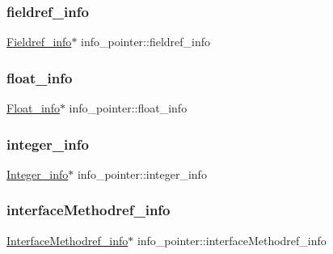 \subsubsection{\texorpdfstring{fieldref\+\_\+info}{fieldref\_info}}
{\footnotesize\ttfamily \hyperlink{struct_fieldref__info}{Fieldref\+\_\+info}$\ast$ info\+\_\+pointer\+::fieldref\+\_\+info}

\hypertarget{unioninfo__pointer_ab4a8a16c10bfcfa7ac7260d4e51d8efc}{}\label{unioninfo__pointer_ab4a8a16c10bfcfa7ac7260d4e51d8efc} 
\subsubsection{\texorpdfstring{float\+\_\+info}{float\_info}}
{\footnotesize\ttfamily \hyperlink{struct_float__info}{Float\+\_\+info}$\ast$ info\+\_\+pointer\+::float\+\_\+info}

\hypertarget{unioninfo__pointer_a05c14a16d3495a2eeb21282cc9ea14fd}{}\label{unioninfo__pointer_a05c14a16d3495a2eeb21282cc9ea14fd} 
\subsubsection{\texorpdfstring{integer\+\_\+info}{integer\_info}}
{\footnotesize\ttfamily \hyperlink{struct_integer__info}{Integer\+\_\+info}$\ast$ info\+\_\+pointer\+::integer\+\_\+info}

\hypertarget{unioninfo__pointer_aa6168768151c8480bf01a20787bc165d}{}\label{unioninfo__pointer_aa6168768151c8480bf01a20787bc165d} 
\subsubsection{\texorpdfstring{interface\+Methodref\+\_\+info}{interfaceMethodref\_info}}
{\footnotesize\ttfamily \hyperlink{struct_interface_methodref__info}{Interface\+Methodref\+\_\+info}$\ast$ info\+\_\+pointer\+::interface\+Methodref\+\_\+info}

\hypertarget{unioninfo__pointer_a17bd96c4e69cb0ccc7ea002320498e5c}{}\label{unioninfo__pointer_a17bd96c4e69cb0ccc7ea002320498e5c} 
